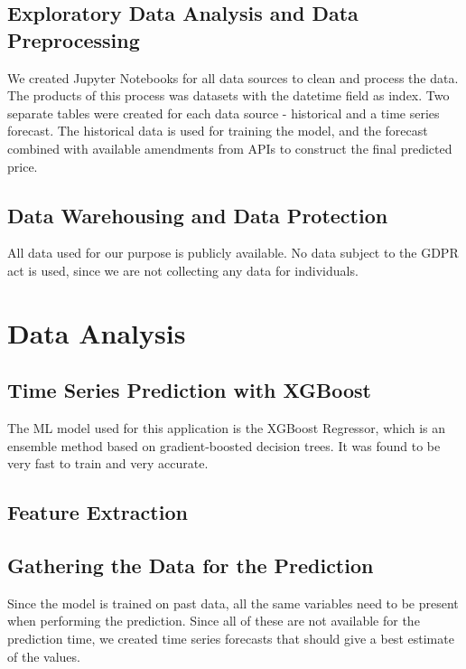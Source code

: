 \documentclass{article}
\begin{document}
\subsection{Exploratory Data Analysis and Data Preprocessing}
\label{subsection:eda}

We created Jupyter Notebooks for all data sources to clean and process the data. The products of this process was datasets with the datetime field as index. Two separate tables were created for each data source - historical and a time series forecast. The historical data is used for training the model, and the forecast combined with available amendments from APIs to construct the final predicted price.

\subsection{Data Warehousing and Data Protection}
\label{subsection:wareousing}

All data used for our purpose is publicly available. No data subject to the GDPR act is used, since we are not collecting any data for individuals.

\section{Data Analysis}
\label{section:analysis}


\subsection{Time Series Prediction with XGBoost}
\label{subsection:xgboost}

The ML model used for this application is the XGBoost Regressor, which is an ensemble method based on gradient-boosted decision trees. It was found to be very fast to train and very accurate.

\subsection{Feature Extraction}
\label{subsection:extraction}

\subsection{Gathering the Data for the Prediction}
\label{subsection:datafilling}

Since the model is trained on past data, all the same variables need to be present when performing the prediction. Since all of these are not available for the prediction time, we created time series forecasts that should give a best estimate of the values.
\end{document}
